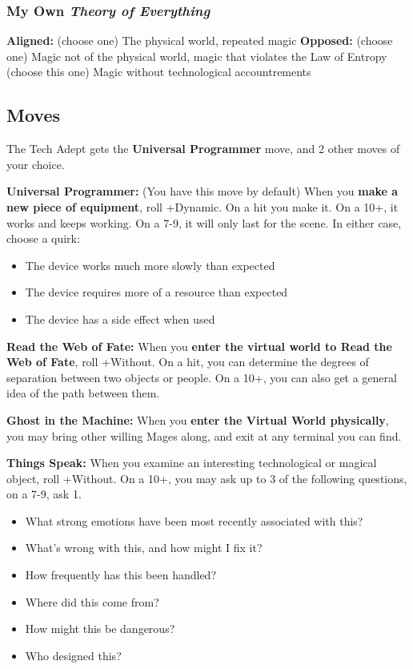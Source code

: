 \documentclass[10pt,twoside,openright]{memoir}
\begin{document}
\hypertarget{my-own-theory-of-everything}{%
\subsubsection{\texorpdfstring{My Own \emph{Theory of
Everything}}{My Own Theory of Everything}}\label{my-own-theory-of-everything}}

\textbf{Aligned:} (choose one) The physical world, repeated magic
\textbf{Opposed:} (choose one) Magic not of the physical world, magic
that violates the Law of Entropy\\
(choose this one) Magic without technological accountrements

\hypertarget{moves-6}{%
\subsection{Moves}\label{moves-6}}

The Tech Adept gets the \textbf{Universal Programmer} move, and 2 other
moves of your choice.

\textbf{Universal Programmer:} (You have this move by default) When you
\textbf{make a new piece of equipment}, roll +Dynamic. On a hit you make
it. On a 10+, it works and keeps working. On a 7-9, it will only last
for the scene. In either case, choose a quirk:

\begin{itemize}
\tightlist
\item
  The device works much more slowly than expected
\item
  The device requires more of a resource than expected
\item
  The device has a side effect when used
\end{itemize}

\textbf{Read the Web of Fate:} When you \textbf{enter the virtual world
to Read the Web of Fate}, roll +Without. On a hit, you can determine the
degrees of separation between two objects or people. On a 10+, you can
also get a general idea of the path between them.

\textbf{Ghost in the Machine:} When you \textbf{enter the Virtual World
physically}, you may bring other willing Mages along, and exit at any
terminal you can find.

\textbf{Things Speak:} When you examine an interesting technological or
magical object, roll +Without. On a 10+, you may ask up to 3 of the
following questions, on a 7-9, ask 1.

\begin{itemize}
\tightlist
\item
  What strong emotions have been most recently associated with this?
\item
  What's wrong with this, and how might I fix it?
\item
  How frequently has this been handled?
\item
  Where did this come from?
\item
  How might this be dangerous?
\item
  Who designed this?
\end{itemize}
\end{document}
